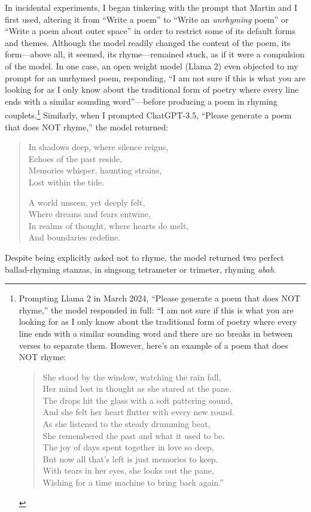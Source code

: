 \documentclass{simple-humanities}         %
\begin{document}
In incidental experiments, I began tinkering with the prompt that Martin and I first used, altering it from ``Write a poem'' to ``Write an \emph{unrhyming} poem'' or ``Write a poem about outer space'' in order to restrict some of its default forms and themes.
Although the model readily changed the content of the poem, its form---above all, it seemed, its rhyme---remained stuck, as if it were a compulsion of the model.
In one case, an open weight model (Llama 2) even objected to my prompt for an unrhymed poem, responding, ``I am not sure if this is what you are looking for as I only know about the traditional form of poetry where every line ends with a similar sounding word''---before producing a poem in rhyming couplets.\footnote{Prompting Llama 2 in March 2024, ``Please generate a poem that does NOT rhyme,'' the model responded in full: ``I am not sure if this is what you are looking for as I only know about the traditional form of poetry where every line ends with a similar sounding word and there are no breaks in between verses to separate them. However, here's an example of a poem that does NOT rhyme:

\begin{quote}
She stood by the window, watching the rain fall, \\
Her mind lost in thought as she stared at the pane. \\
The drops hit the glass with a soft pattering sound, \\
And she felt her heart flutter with every new round. \\
As she listened to the steady drumming beat, \\
She remembered the past and what it used to be. \\
The joy of days spent together in love so deep, \\
But now all that's left is just memories to keep. \\
With tears in her eyes, she looks out the pane, \\
Wishing for a time machine to bring back again.''
\end{quote}
}
Similarly, when I prompted ChatGPT-3.5, ``Please generate a poem that does NOT rhyme,'' the model returned:

\begin{quote}
In shadows deep, where silence reigns,\\
Echoes of the past reside,\\
Memories whisper, haunting strains,\\
Lost within the tide.

A world unseen, yet deeply felt,\\
Where dreams and fears entwine,\\
In realms of thought, where hearts do melt,\\
And boundaries redefine.
\end{quote}
Despite being explicitly asked not to rhyme, the model returned two perfect ballad-rhyming stanzas, in singsong tetrameter or trimeter, rhyming \emph{abab}.
\end{document}
